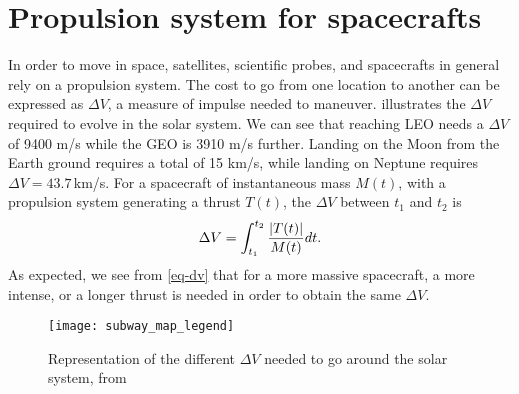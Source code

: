 


\section{Propulsion system for spacecrafts}
\label{sec-propulsion}


In order to move in space, satellites, scientific probes, and spacecrafts in general rely on a propulsion system.
The cost to go from one location to another can be expressed as $\Delta V$, a measure of impulse needed to maneuver.
 illustrates the $\Delta V$ required to evolve in the solar system.
We can see that reaching \ac{LEO} needs a $\Delta V$ of 9400 m/s while the \ac{GEO} is 3910 m/s further.
Landing on the Moon from the Earth ground requires a total of 15 km/s, while landing on Neptune requires $\Delta V =43.7$\,km/s.
For a spacecraft of instantaneous mass $M(t)$, with a propulsion system generating a thrust $T(t)$, the $\Delta V$ between $t_1$ and $t_2$ is
\begin{equation} \label{eq-dv}
  \Delta V = \int_{t_1}^{t_2} \frac{ \lvert T(t)\rvert}{M(t)} dt.
\end{equation}
As expected, we see from \cref{eq-dv} that for a more massive spacecraft, a more intense, or a longer thrust is needed in order to obtain the same $\Delta V$.
\begin{figure}[!hbt]
  \centering
  \texttt{[image: subway\_map\_legend]}
  \caption{Representation of the different $\Delta V$ needed to go around the solar system, from \citet{reddit-subway}}
  \label{fig-subway_DV}
\end{figure}

